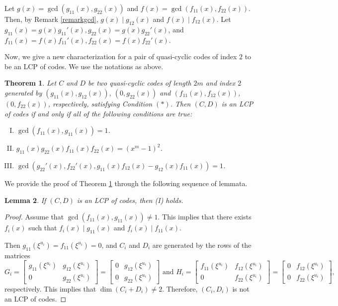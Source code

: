 \documentclass[12 pt]{extarticle}
\numberwithin{equation}{section}
\newtheorem{theorem}{Theorem}[section]
\newtheorem{lemma}[theorem]{Lemma}
\theoremstyle{definition}
\begin{document}
Let $g(x)=\gcd(g_{11}(x),g_{22}(x))$ and $f(x)=\gcd(f_{11}(x),f_{22}(x))$. Then, by Remark \ref{remarkgcd}, $g(x)\mid g_{12}(x)$ and $f(x)\mid f_{12}(x)$.
Let $g_{11}(x)=g(x)   g_{11}'(x), g_{22}(x)=g(x) g_{22}'(x)$, and $f_{11}(x)=f(x)   f_{11}'(x), f_{22}(x)=f(x) f_{22}'(x)$. 

Now, we give a new characterization for a pair of quasi-cyclic codes of index $2$ to be an LCP of codes. We use the notations as above.

\begin{theorem}\label{qslcp}
Let $C$ and $D$ be two quasi-cyclic codes of length $2m$ and index $2$ generated by $(g_{11}(x),g_{12}(x))$, $(0,g_{22}(x))$ and $(f_{11}(x),f_{12}(x))$, $(0,f_{22}(x))$, respectively, satisfying Condition $(\ast)$. Then $(C,D)$ is an LCP of codes if and only if all of the following conditions are true:
	\begin{enumerate}[(I)]
       \item  $\gcd(f_{11}(x),g_{11}(x))=1$.
		\item  $g_{11}(x)g_{22}(x)f_{11}(x)f_{22}(x)=(x^m-1)^2$.
		\item $\gcd(g_{22}'(x),f_{22}'(x), g_{11}(x)f_{12}(x)-g_{12}(x)f_{11}(x))=1$.
	\end{enumerate}
\end{theorem}
We provide the proof of Theorem \ref{qslcp} through the following sequence of lemmata.
\begin{lemma} \label{nI} If $(C,D)$ is an LCP of codes, then  (I) holds. 
\end{lemma}
\begin{proof}
     Assume that $\gcd(f_{11}(x),g_{11}(x))\neq 1$. This implies that there exists $f_i(x)$ such that $f_i(x)\mid g_{11}(x)$ and $f_i(x)\mid f_{11}(x)$. 


Then $g_{11}(\xi^{u_i})= f_{11}(\xi^{u_i})=0$, and $C_i$ and $D_i$ are generated by the rows of the  matrices
$$
G_i=\begin{bmatrix}
g_{11}(\xi^{u_i}) & g_{12}(\xi^{u_i}) \\
0 & g_{22}(\xi^{u_i}) 
\end{bmatrix}    = \begin{bmatrix}
0 & g_{12}(\xi^{u_i}) \\
0 & g_{22}(\xi^{u_i}) 
\end{bmatrix} \text{ and } H_i=\begin{bmatrix}
f_{11}(\xi^{u_i}) & f_{12}(\xi^{u_i}) \\
0 & f_{22}(\xi^{u_i}) 
\end{bmatrix}    = \begin{bmatrix}
0 & f_{12}(\xi^{u_i}) \\
0 & f_{22}(\xi^{u_i})  
\end{bmatrix},
$$ respectively.
This implies that  $\dim(C_i+D_i)\neq 2$.  Therefore, $(C_i,D_i)$ is not an LCP of codes.     
\end{proof}
\end{document}
